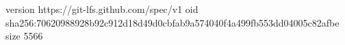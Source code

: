 version https://git-lfs.github.com/spec/v1
oid sha256:70620988928b92c912d18d49d0cbfab9a574040f4a499fb553dd04005c82afbe
size 5566
